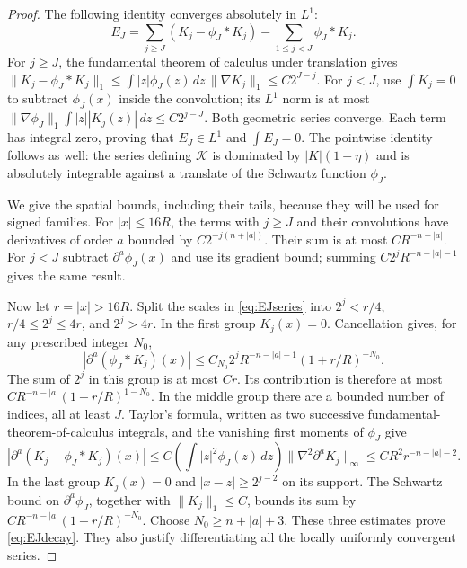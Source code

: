 \documentclass[11pt,oneside]{article}
\theoremstyle{definition}\newtheorem{definition}[theorem]{Definition}
\theoremstyle{remark}\newtheorem{remark}[theorem]{Remark}
\begin{document}
\begin{proof}
The following identity converges absolutely in $L^1$:
\begin{equation}\label{eq:EJseries}
 E_J=\sum_{j\geq J}(K_j-\phi_J*K_j)-\sum_{1\leq j<J}\phi_J*K_j.
\end{equation}
For $j\geq J$, the fundamental theorem of calculus under translation gives
$\|K_j-\phi_J*K_j\|_1\leq\int|z|\phi_J(z)\,dz\,\|\nabla K_j\|_1
\leq C2^{J-j}$.
For $j<J$, use $\int K_j=0$ to subtract $\phi_J(x)$ inside the convolution;
its $L^1$ norm is at most
$\|\nabla\phi_J\|_1\int|z||K_j(z)|\,dz\leq C2^{j-J}$.
Both geometric series converge. Each term has integral zero, proving that
$E_J\in L^1$ and $\int E_J=0$. The pointwise identity follows as well: the
series defining $\mathcal K$ is dominated by $|K|(1-\eta)$ and is absolutely
integrable against a translate of the Schwartz function $\phi_J$.

We give the spatial bounds, including their tails, because they will be used
for signed families. For $|x|\leq16R$, the terms with $j\geq J$ and their
convolutions have derivatives of order $a$ bounded by
$C2^{-j(n+|a|)}$. Their sum is at most $CR^{-n-|a|}$. For $j<J$ subtract
$\partial^a\phi_J(x)$ and use its gradient bound; summing
$C2^jR^{-n-|a|-1}$ gives the same result.

Now let $r=|x|>16R$. Split the scales in \eqref{eq:EJseries} into
$2^j<r/4$, $r/4\leq2^j\leq4r$, and $2^j>4r$.
In the first group $K_j(x)=0$. Cancellation gives, for any prescribed integer
$N_0$,
\[
 |\partial^a(\phi_J*K_j)(x)|
 \leq C_{N_0}2^jR^{-n-|a|-1}(1+r/R)^{-N_0}.
\]
The sum of $2^j$ in this group is at most $Cr$. Its contribution is therefore
at most $CR^{-n-|a|}(1+r/R)^{1-N_0}$.
In the middle group there are a bounded number of indices, all at least $J$.
Taylor's formula, written as two successive fundamental-theorem-of-calculus
integrals, and the vanishing first moments of $\phi_J$ give
\[
 |\partial^a(K_j-\phi_J*K_j)(x)|
 \leq C\left(\int|z|^2\phi_J(z)\,dz\right)
                  \|\nabla^2\partial^aK_j\|_\infty
 \leq C R^2r^{-n-|a|-2}.
\]
In the last group $K_j(x)=0$ and $|x-z|\geq2^{j-2}$ on its support.
The Schwartz bound on $\partial^a\phi_J$, together with $\|K_j\|_1\leq C$,
bounds its sum by
$CR^{-n-|a|}(1+r/R)^{-N_0}$.
Choose $N_0\geq n+|a|+3$. These three estimates prove \eqref{eq:EJdecay}.
They also justify differentiating all the locally uniformly convergent series.


\end{proof}
\end{document}

